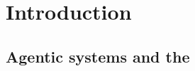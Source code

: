 %

\chapter{Introduction}\label{ch:introduction}

\section{Agentic  systems and the }\label{sec:agentic-mcp}

